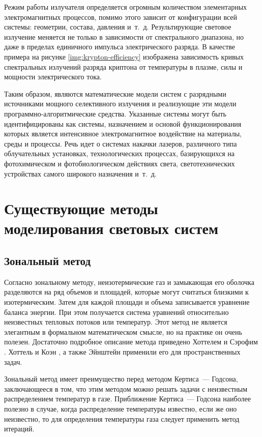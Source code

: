 Режим работы излучателя определяется огромным количеством элементарных электромагнитных процессов, помимо этого зависит от конфигурации всей системы: геометрии, состава, давления и~т.~д.
Результирующие световое излучение меняется не только в зависимости от спектрального диапазона, но даже в пределах единичного импульса электрического разряда.
В качестве примера на рисунке \ref{img:krypton-efficiency} изображена зависимость кривых спектральных излучений разряда криптона от температуры в плазме, силы и мощности электрического тока.

Таким образом,  являются математические модели систем с разрядными источниками мощного селективного излучения и реализующие эти модели программно-алгоритмические средства.
Указанные системы могут быть идентифицированы как системы, назначением и основой функционирования которых является интенсивное электромагнитное воздействие на материалы, среды и процессы.
Речь идет о системах накачки лазеров, различного типа облучательных установках, технологических процессах, базирующихся на фотохимическом и фотобиологическом действиях света, светотехнических устройствах самого широкого назначения и~т.~д.

\section{Существующие методы моделирования световых систем}

\subsection{Зональный метод}

Согласно зональному методу, неизотермические газ и
замыкающая его оболочка разделяются на ряд объемов и площадей, которые
могут считаться близкими к изотермическим. Затем для каждой
площади и объема записывается уравнение баланса энергии. При
этом получается система уравнений относительно неизвестных
тепловых потоков или температур. Этот метод
не является элегантным в формальном математическом смысле,
но на практике он очень полезен. Достаточно подробное описание
метода приведено Хоттелем и Сэрофим \cite{hottel-1}. Хоттель и Коэн \cite{hottel-2},
а также Эйнштейн \cite{einstein-1, einstein-2} применили его для пространственных задач.

Зональный метод имеет преимущество перед методом Кертиса~—
Годсона, заключающееся в том, что этим методом можно решать
задачи с неизвестным распределением температур в газе.
Приближение Кертиса~— Годсона наиболее полезно в случае, когда
распределение температуры известно, если же оно неизвестно, то для
определения температуры газа следует применить метод итераций.

